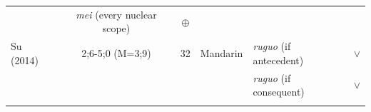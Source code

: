 \documentclass[oneside]{report}
\theoremstyle{definition}
\theoremstyle{definition}
\theoremstyle{definition}
\theoremstyle{remark}
\begin{document}
\begin{longtable}[]{@{}lccclc@{}}
\begin{minipage}[t]{0.10\columnwidth}
\strut
\end{minipage} & \begin{minipage}[t]{0.25\columnwidth}\raggedright\strut
\emph{mei} (every nuclear scope)\strut
\end{minipage} & \begin{minipage}[t]{0.13\columnwidth}\centering\strut
\(\oplus\)\strut
\end{minipage}\tabularnewline
\begin{minipage}[t]{0.23\columnwidth}\raggedright\strut
Su (2014)\strut
\end{minipage} & \begin{minipage}[t]{0.07\columnwidth}\centering\strut
2;6-5;0 (M=3;9)\strut
\end{minipage} & \begin{minipage}[t]{0.05\columnwidth}\centering\strut
32\strut
\end{minipage} & \begin{minipage}[t]{0.10\columnwidth}\centering\strut
Mandarin\strut
\end{minipage} & \begin{minipage}[t]{0.25\columnwidth}\raggedright\strut
\emph{ruguo} (if antecedent)\strut
\end{minipage} & \begin{minipage}[t]{0.13\columnwidth}\centering\strut
\(\lor\)\strut
\end{minipage}\tabularnewline
\begin{minipage}[t]{0.23\columnwidth}\raggedright\strut
\strut
\end{minipage} & \begin{minipage}[t]{0.07\columnwidth}\centering\strut
\strut
\end{minipage} & \begin{minipage}[t]{0.05\columnwidth}\centering\strut
\strut
\end{minipage} & \begin{minipage}[t]{0.10\columnwidth}\centering\strut
\strut
\end{minipage} & \begin{minipage}[t]{0.25\columnwidth}\raggedright\strut
\emph{ruguo} (if consequent)\strut
\end{minipage} & \begin{minipage}[t]{0.13\columnwidth}\centering\strut
\(\lor\)\strut
\end{minipage}\tabularnewline
\begin{minipage}[t]{0.23\columnwidth}\raggedright\strut
\strut
\end{minipage} & \begin{minipage}[t]{0.07\columnwidth}\centering\strut

\end{minipage}
\end{longtable}
\end{document}
